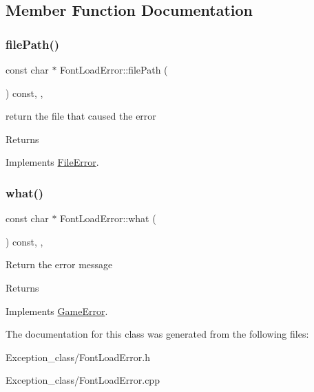 \subsection{Member Function Documentation}
\mbox{\label{classFontLoadError_aa1b4295ca60b389717e40fcbf723fb83}} 
\subsubsection{\texorpdfstring{file\+Path()}{filePath()}}
{\footnotesize\ttfamily const char $\ast$ Font\+Load\+Error\+::file\+Path (\begin{DoxyParamCaption}{ }\end{DoxyParamCaption}) const\hspace{0.3cm}{\ttfamily [override]}, {\ttfamily [virtual]}, {\ttfamily [noexcept]}}

return the file that caused the error \begin{DoxyReturn}{Returns}

\end{DoxyReturn}


Implements \hyperlink{classFileError_a40918f5dda2ee7063bba81d286392cdd}{File\+Error}.

\mbox{\label{classFontLoadError_a523f16150eb19d25ed5692512e6952f5}} 
\subsubsection{\texorpdfstring{what()}{what()}}
{\footnotesize\ttfamily const char $\ast$ Font\+Load\+Error\+::what (\begin{DoxyParamCaption}{ }\end{DoxyParamCaption}) const\hspace{0.3cm}{\ttfamily [override]}, {\ttfamily [virtual]}, {\ttfamily [noexcept]}}

Return the error message \begin{DoxyReturn}{Returns}

\end{DoxyReturn}


Implements \hyperlink{classGameError_afbe93d6a2023f2824be2733aff9e86cb}{Game\+Error}.



The documentation for this class was generated from the following files\+:\begin{DoxyCompactItemize}
\item 
Exception\+\_\+class/Font\+Load\+Error.\+h\item 
Exception\+\_\+class/Font\+Load\+Error.\+cpp\end{DoxyCompactItemize}

